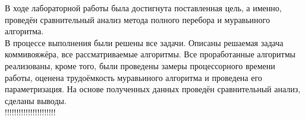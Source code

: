 В ходе лабораторной работы была достигнута поставленная цель, а именно, проведён сравнительный анализ метода полного перебора и муравьиного алгоритма. \\

В процессе выполнения были решены все задачи. Описаны решаемая задача коммивояжёра, все рассматриваемые алгоритмы. Все проработанные алгоритмы реализованы, кроме того, были проведены замеры процессорного времени работы, оценена трудоёмкость муравьиного алгоритма и проведена его параметризация. На основе полученных данных проведён сравнительный анализ, сделаны выводы.\\

!!!!!!!!!!!!!!!!!!!!!!